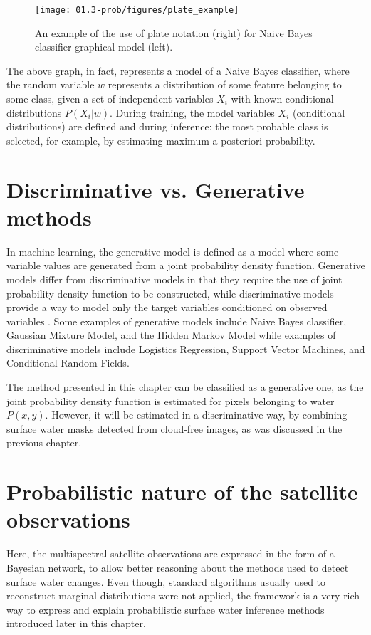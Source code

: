 \begin{figure}[H]
	\centering
	\texttt{[image: 01.3-prob/figures/plate\_example]}
	\caption{An example of the use of plate notation (right) for Naive Bayes classifier graphical model (left).}
	\label{fig:plate-example}
\end{figure}

The above graph, in fact, represents a model of a Naive Bayes classifier, where the random variable $w$ represents a distribution of some feature belonging to some class, given a set of independent variables $X_i$ with known conditional distributions $P{(X_i|w)}$. During training, the model variables $X_i$ (conditional distributions) are defined and during inference: the most probable class is selected, for example, by estimating maximum a posteriori probability.

\section{Discriminative vs. Generative methods}

In machine learning, the generative model is defined as a model where some variable values are generated from a joint probability density function. Generative models differ from discriminative models in that they require the use of joint probability density function to be constructed, while discriminative models provide a way to model only the target variables conditioned on observed variables \citet{ng2002discriminative}. Some examples of generative models include Naive Bayes classifier, Gaussian Mixture Model, and the Hidden Markov Model while examples of discriminative models include Logistics Regression, Support Vector Machines, and Conditional Random Fields. 

The method presented in this chapter can be classified as a generative one, as the joint probability density function is estimated for pixels belonging to water $P(x, y)$. However, it will be estimated in a discriminative way, by combining surface water masks detected from cloud-free images, as was discussed in the previous chapter.

\section{Probabilistic nature of the satellite observations}

Here, the multispectral satellite observations are expressed in the form of a Bayesian network, to allow better reasoning about the methods used to detect surface water changes. Even though, standard algorithms usually used to reconstruct marginal distributions were not applied, the framework is a very rich way to express and explain probabilistic surface water inference methods introduced later in this chapter.

